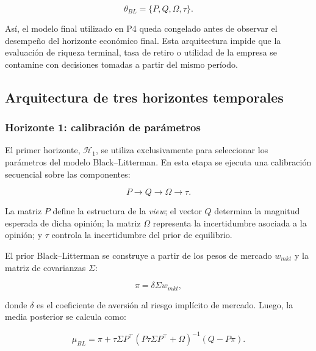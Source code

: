\documentclass[11pt]{article}
\begin{document}
\begin{equation}
    \theta_{BL}
    =
    \{P, Q, \Omega, \tau\}.
\end{equation}

As\'i, el modelo final utilizado en P4 queda congelado antes de observar el desempe\~no del horizonte econ\'omico final. Esta arquitectura impide que la evaluaci\'on de riqueza terminal, tasa de retiro o utilidad de la empresa se contamine con decisiones tomadas a partir del mismo per\'iodo.

\subsection{Arquitectura de tres horizontes temporales}

\subsubsection{Horizonte 1: calibraci\'on de par\'ametros}

El primer horizonte, $\mathcal{H}_1$, se utiliza exclusivamente para seleccionar los par\'ametros del modelo Black--Litterman. En esta etapa se ejecuta una calibraci\'on secuencial sobre las componentes:

\begin{equation}
    P \rightarrow Q \rightarrow \Omega \rightarrow \tau.
\end{equation}

La matriz $P$ define la estructura de la \textit{view}; el vector $Q$ determina la magnitud esperada de dicha opini\'on; la matriz $\Omega$ representa la incertidumbre asociada a la opini\'on; y $\tau$ controla la incertidumbre del prior de equilibrio.

El prior Black--Litterman se construye a partir de los pesos de mercado $w_{mkt}$ y la matriz de covarianzas $\Sigma$:

\begin{equation}
    \pi = \delta \Sigma w_{mkt},
\end{equation}

donde $\delta$ es el coeficiente de aversi\'on al riesgo impl\'icito de mercado. Luego, la media posterior se calcula como:

\begin{equation}
    \mu_{BL}
    =
    \pi
    +
    \tau \Sigma P^\top
    \left(
    P \tau \Sigma P^\top + \Omega
    \right)^{-1}
    \left(
    Q - P\pi
    \right).
\end{equation}
\end{document}
